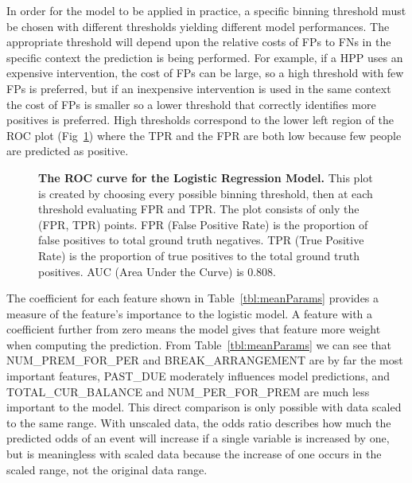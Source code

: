 \documentclass[10pt,letterpaper]{article}
\begin{document}
In order for the model to be applied in practice, a specific binning threshold must be chosen with different thresholds yielding different model performances. The appropriate threshold will depend upon the relative costs of FPs to FNs in the specific context the prediction is being performed. For example, if a HPP uses an expensive intervention, the cost of FPs can be large, so a high threshold with few FPs is preferred, but if an inexpensive intervention is used in the same context the cost of FPs is smaller so a lower threshold that correctly identifies more positives is preferred. High thresholds correspond to the lower left region of the ROC plot (Fig~\ref{fig:ROC}) where the TPR and the FPR are both low because few people are predicted as positive.

\begin{figure}[htb]
    \centering
    \caption[ROC curve]{{\bf The ROC curve for the Logistic Regression Model.} This plot is created by choosing every possible binning threshold, then at each threshold evaluating FPR and TPR. The plot consists of only the (FPR, TPR) points. FPR (False Positive Rate) is the proportion of false positives to total ground truth negatives. TPR (True Positive Rate) is the proportion of true positives to the total ground truth positives. AUC (Area Under the Curve) is 0.808.}
    \label{fig:ROC}
\end{figure}

The coefficient for each feature shown in Table~\ref{tbl:meanParams} provides a measure of the feature's importance to the logistic model. A feature with a coefficient further from zero means the model gives that feature more weight when computing the prediction. From Table~\ref{tbl:meanParams} we can see that NUM\_PREM\_FOR\_PER and BREAK\_ARRANGEMENT are by far the most important features, PAST\_DUE moderately influences model predictions, and TOTAL\_CUR\_BALANCE and NUM\_PER\_FOR\_PREM are much less important to the model. This direct comparison is only possible with data scaled to the same range. With unscaled data, the odds ratio describes how much the predicted odds of an event will increase if a single variable is increased by one, but is meaningless with scaled data because the increase of one occurs in the scaled range, not the original data range. 
\end{document}
